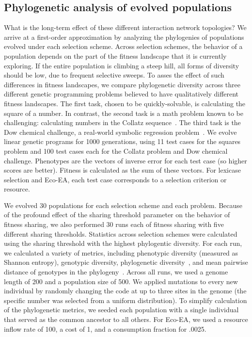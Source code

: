 \subsection{Phylogenetic analysis of evolved populations}
What is the long-term effect of these different interaction network topologies? We arrive at a first-order approximation by analyzing the phylogenies of populations evolved under each selection scheme. Across selection schemes, the behavior of a population depends on the part of the fitness landscape that it is currently exploring. If the entire population is climbing a steep hill, all forms of diversity should be low, due to frequent selective sweeps. To asses the effect of such differences in fitness landscapes, we compare phylogenetic diversity across three different genetic programming problems believed to have qualitatively different fitness landscapes. The first task, chosen to be quickly-solvable, is calculating the square of a number. In contrast, the second task is a math problem known to be challenging: calculating numbers in the Collatz sequence~\cite{helmuth_general_2015}. The third task is the Dow chemical challenge, a real-world symbolic regression problem~\cite{white_better_2013}. We evolve linear genetic programs for 1000 generations, using 11 test cases for the squares problem and 100 test cases each for the Collatz problem and Dow chemical challenge. Phenotypes are the vectors of inverse error for each test case (so higher scores are better). Fitness is calculated as the sum of these vectors. For lexicase selection and Eco-EA, each test case corresponds to a selection criterion or resource. 


We evolved 30 populations for each selection scheme and each problem. Because of the profound effect of the sharing threshold parameter on the behavior of fitness sharing, we also performed 30 runs each of fitness sharing with five different sharing thresholds. Statistics across selection schemes were calculated using the sharing threshold with the highest phylogentic diversity. For each run, we calculated a variety of metrics, including phenotypic diversity (measured as Shannon entropy), genotypic diversity, phylogenetic diversity~\cite{faith_conservation_1992}, and mean pairwise distance of genotypes in the phylogeny~\cite{webb_exploring_2000}. Across all runs, we used a genome length of 200 and a population size of 500. We applied mutations to every new individual by randomly changing the code at up to three sites in the genome (the specific number was selected from a uniform distribution). To simplify calculation of the phylogenetic metrics, we seeded each population with a single individual that served as the common ancestor to all others.
For Eco-EA, we used a resource inflow rate of 100, a cost of 1, and a consumption fraction for .0025.

